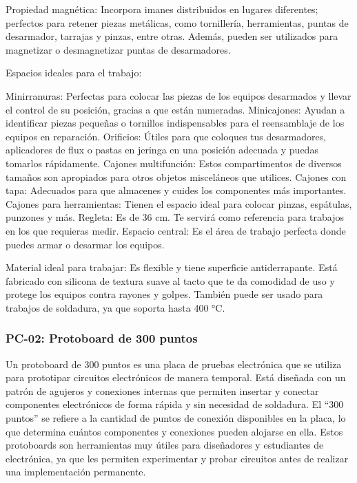 Propiedad magnética: Incorpora imanes distribuidos en lugares diferentes; perfectos para retener piezas metálicas, como tornillería, herramientas, puntas de desarmador, tarrajas y pinzas, entre otras. Además, pueden ser utilizados para magnetizar o desmagnetizar puntas de desarmadores.


Espacios ideales para el trabajo:

Minirranuras: Perfectas para colocar las piezas de los equipos desarmados y llevar el control de su posición, gracias a que están numeradas.
Minicajones: Ayudan a identificar piezas pequeñas o tornillos indispensables para el reensamblaje de los equipos en reparación.
Orificios: Útiles para que coloques tus desarmadores, aplicadores de flux o pastas en jeringa en una posición adecuada y puedas tomarlos rápidamente.
Cajones multifunción: Estos compartimentos de diversos tamaños son apropiados para otros objetos misceláneos que utilices.
Cajones con tapa: Adecuados para que almacenes y cuides los componentes más importantes.
Cajones para herramientas: Tienen el espacio ideal para colocar pinzas, espátulas, punzones y más.
Regleta: Es de 36 cm. Te servirá como referencia para trabajos en los que requieras medir.
Espacio central: Es el área de trabajo perfecta donde puedes armar o desarmar los equipos.

Material ideal para trabajar: Es flexible y tiene superficie antiderrapante. Está fabricado con silicona de textura suave al tacto que te da comodidad de uso y protege los equipos contra rayones y golpes. También puede ser usado para trabajos de soldadura, ya que soporta hasta 400 °C.



\subsubsection{PC-02: Protoboard de 300 puntos}

Un protoboard de 300 puntos es una placa de pruebas electrónica que se utiliza para prototipar circuitos electrónicos de manera temporal. Está diseñada con un patrón de agujeros y conexiones internas que permiten insertar y conectar componentes electrónicos de forma rápida y sin necesidad de soldadura. El “300 puntos” se refiere a la cantidad de puntos de conexión disponibles en la placa, lo que determina cuántos componentes y conexiones pueden alojarse en ella. Estos protoboards son herramientas muy útiles para diseñadores y estudiantes de electrónica, ya que les permiten experimentar y probar circuitos antes de realizar una implementación permanente.

